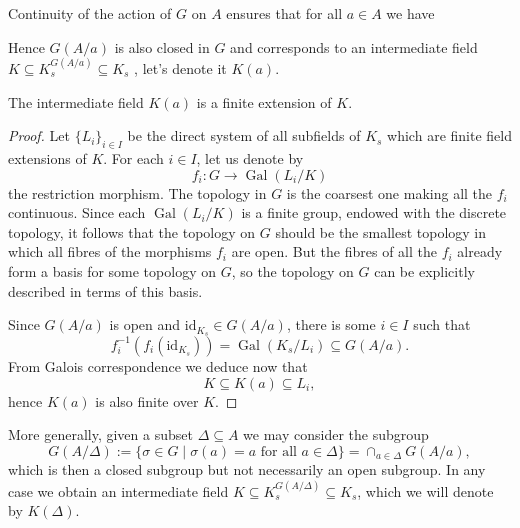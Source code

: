 \documentclass[12pt]{amsart}
\DeclareMathOperator{\Gal}{Gal}
\newcommand{\id}{\mathrm{id}}
\begin{document}
Continuity of the action of $G$ on $A$ ensures that for all $a\in A$ we have
\begin{center}
\end{center}
Hence $G(A/a)$ is also closed in $G$ and corresponds to an intermediate field $K\subseteq K_{s}^{G(A/a)}\subseteq K_{s}$ \cite[4.2/3]{bos18}, let's denote it $K(a)$.

\begin{lm}
    The intermediate field $K(a)$ is a finite extension of $K$.
    \begin{proof}
	Let $\{ L_{i} \}_{i\in I}$ be the direct system of all subfields of $K_{s}$ which are finite field extensions of $K$.
	For each $i\in I$, let us denote by
	\[ f_{i}\colon G\to \Gal(L_{i}/K) \]
	the restriction morphism.
	The topology in $G$ is the coarsest one making all the $f_{i}$ continuous.
	Since each $\Gal(L_{i}/K)$ is a finite group, endowed with the discrete topology, it follows that the topology on $G$ should be the smallest topology in which all fibres of the morphisms $f_{i}$ are open.
	But the fibres of all the $f_{i}$ already form a basis for some topology on $G$, so the topology on $G$ can be explicitly described in terms of this basis.

	Since $G(A/a)$ is open and $\id_{K_{s}}\in G(A/a)$, there is some $i\in I$ such that
	\[ f_{i}^{-1}(f_{i}(\id_{K_{s}}))=\Gal(K_{s}/L_{i})\subseteq G(A/a). \]
	From Galois correspondence we deduce now that
	\[ K\subseteq K(a)\subseteq L_{i}, \]
	hence $K(a)$ is also finite over $K$.
    \end{proof}
\end{lm}

More generally, given a subset $\Delta\subseteq A$ we may consider the subgroup
\[ G(A/\Delta):=\{\sigma\in G\mid \sigma(a)=a \text{ for all }a\in \Delta\}=\cap_{a\in \Delta}G(A/a), \]
which is then a closed subgroup but not necessarily an open subgroup.
In any case we obtain an intermediate field $K\subseteq K_{s}^{G(A/\Delta)}\subseteq K_{s}$, which we will denote by $K(\Delta)$.
\end{document}
